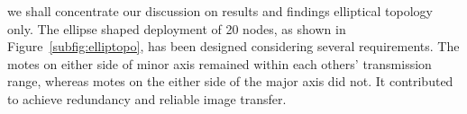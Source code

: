 \documentclass[conference]{IEEEtran}
\newcommand{\notedme}[1]{\raisebox{0pt}[0pt][0pt]{\pdfcomment[open=true,color=blue]{#1}}}
\begin{document}

we shall concentrate our discussion on results and findings elliptical topology only.
The ellipse shaped deployment of 20 nodes, as shown in Figure~\ref{subfig:elliptopo}, has been designed considering several requirements.
The motes on either side of minor axis remained within each others' transmission range, whereas motes on the either side of the major axis did not.
It contributed to achieve  redundancy and  reliable image transfer. 
\end{document}
